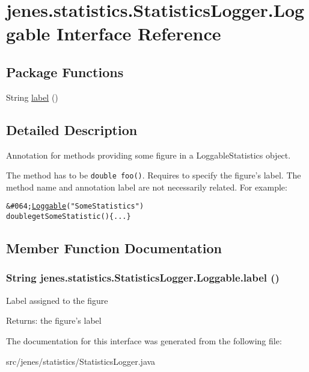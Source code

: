\hypertarget{interfacejenes_1_1statistics_1_1_statistics_logger_1_1_loggable}{
\section{jenes.statistics.StatisticsLogger.Loggable Interface Reference}
\label{interfacejenes_1_1statistics_1_1_statistics_logger_1_1_loggable}
}
\subsection*{Package Functions}
\begin{CompactItemize}
\item 
String \hyperlink{interfacejenes_1_1statistics_1_1_statistics_logger_1_1_loggable_4af45b207d6c314f587d8220a17bce95}{label} ()
\end{CompactItemize}


\subsection{Detailed Description}
Annotation for methods providing some figure in a LoggableStatistics object.

The method has to be {\tt double foo()}. Requires to specify the figure's label. The method name and annotation label are not necessarily related. For example:

\small\begin{alltt}
 \&\#064;\hyperlink{interfacejenes_1_1statistics_1_1_statistics_logger_1_1_loggable}{Loggable}("SomeStatistics")
 double getSomeStatistic() \{...\}
 \end{alltt}
\normalsize 
 

\subsection{Member Function Documentation}
\hypertarget{interfacejenes_1_1statistics_1_1_statistics_logger_1_1_loggable_4af45b207d6c314f587d8220a17bce95}{
\subsubsection[label]{\setlength{\rightskip}{0pt plus 5cm}String jenes.statistics.StatisticsLogger.Loggable.label ()}}
\label{interfacejenes_1_1statistics_1_1_statistics_logger_1_1_loggable_4af45b207d6c314f587d8220a17bce95}


Label assigned to the figure

\begin{Desc}
\item[Returns:]the figure's label \end{Desc}


The documentation for this interface was generated from the following file:\begin{CompactItemize}
\item 
src/jenes/statistics/StatisticsLogger.java\end{CompactItemize}
